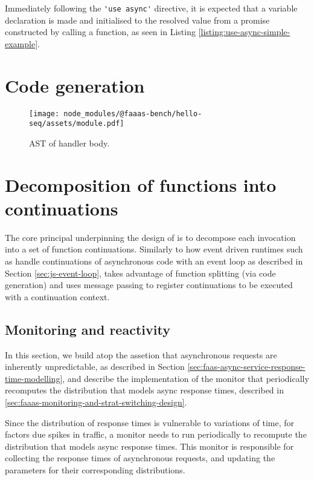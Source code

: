 Immediately following the \verb|'use async'| directive, it is expected that a variable declaration is made and initialised to the resolved value from a promise constructed by calling a function, as seen in Listing \ref{listing:use-async-simple-example}.

\section{Code generation}
\label{sec:faaasc-codegen-ast}

\begin{figure}[t]
    \texttt{[image: node\_modules/@faaas-bench/hello-seq/assets/module.pdf]}
    \caption{AST of handler body.}
    \label{fig:suites-hello-seq-module-ast}
\end{figure}

\section{Decomposition of \faas{} functions into continuations}
The core principal underpinning the design of \faaas{} is to decompose each \faas{} invocation into a set of function continuations. Similarly to how event driven runtimes such as \js{} handle continuations of asynchronous code with an event loop as described in Section \ref{sec:js-event-loop}, \faaas{} takes advantage of function splitting (via code generation) and uses message passing to register continuations to be executed with a continuation context.

\subsection{Monitoring and reactivity}
In this section, we build atop the assetion that asynchronous requests are inherently unpredictable, as described in Section \ref{sec:faas-async-service-response-time-modelling}, and describe the implementation of the monitor that periodically recomputes the distribution that models async response times, described in \ref{sec:faaas-monitoring-and-strat-switching-design}.

Since the distribution of response times is vulnerable to variations of time, for factors due spikes in traffic, a monitor needs to run periodically to recompute the distribution that models async response times. This monitor is responsible for collecting the response times of asynchronous requests, and updating the parameters for their corresponding distributions.

